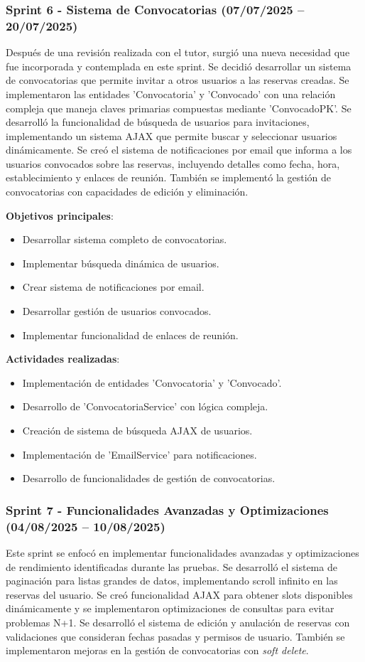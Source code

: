 \subsubsection{Sprint 6 - Sistema de Convocatorias (07/07/2025 – 20/07/2025)} 
Después de una revisión realizada con el tutor, surgió una nueva necesidad que fue incorporada y contemplada en este sprint. Se decidió desarrollar un sistema de convocatorias que permite invitar a otros usuarios a las reservas creadas. Se implementaron las entidades 'Convocatoria' y 'Convocado' con una relación compleja que maneja claves primarias compuestas mediante 'ConvocadoPK'. Se desarrolló la funcionalidad de búsqueda de usuarios para invitaciones, implementando un sistema AJAX que permite buscar y seleccionar usuarios dinámicamente. Se creó el sistema de notificaciones por email que informa a los usuarios convocados sobre las reservas, incluyendo detalles como fecha, hora, establecimiento y enlaces de reunión. También se implementó la gestión de convocatorias con capacidades de edición y eliminación.

\textbf{Objetivos principales}:
\begin{itemize}
\tightlist
\item
Desarrollar sistema completo de convocatorias.
\item
Implementar búsqueda dinámica de usuarios.
\item
Crear sistema de notificaciones por email.
\item
Desarrollar gestión de usuarios convocados.
\item
Implementar funcionalidad de enlaces de reunión.
\end{itemize}

\textbf{Actividades realizadas}:
\begin{itemize}
\tightlist
\item
Implementación de entidades 'Convocatoria' y 'Convocado'.
\item
Desarrollo de 'ConvocatoriaService' con lógica compleja.
\item
Creación de sistema de búsqueda AJAX de usuarios.
\item
Implementación de 'EmailService' para notificaciones.
\item
Desarrollo de funcionalidades de gestión de convocatorias.
\end{itemize}

\subsubsection{Sprint 7 - Funcionalidades Avanzadas y Optimizaciones (04/08/2025 – 10/08/2025)} 
Este sprint se enfocó en implementar funcionalidades avanzadas y optimizaciones de rendimiento identificadas durante las pruebas. Se desarrolló el sistema de paginación para listas grandes de datos, implementando scroll infinito en las reservas del usuario. Se creó funcionalidad AJAX para obtener slots disponibles dinámicamente y se implementaron optimizaciones de consultas para evitar problemas N+1. Se desarrolló el sistema de edición y anulación de reservas con validaciones que consideran fechas pasadas y permisos de usuario. También se implementaron mejoras en la gestión de convocatorias con \emph{soft delete}.

